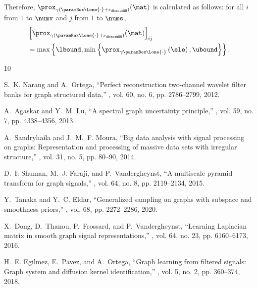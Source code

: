 \documentclass[journal]{IEEEtran}
\begin{document}
Therefore, $\prox_{\gamma(\paramBox \Lone{\cdot} + \iota_{\BoxconNM})} (\mat)$ is calculated as follows: for all $i$ from $1$ to $\numv$ and $j$ from $1$ to $\nums$,
\begin{align}
    &\left[\prox_{\gamma( \paramBox \Lone{\cdot} + \iota_{\BoxconNM})} (\mat)\right]_{ij} \nonumber \\
    &= \max \left\{ \lbound, \min\left\{ \prox_{\gamma \paramBox \Lone{\cdot}}\left(\ele\right), \ubound \right\}\right\}.
\end{align}

\ifCLASSOPTIONcaptionsoff
  \newpage
\fi


\begin{thebibliography}{10}

    S.~K. Narang and A.~Ortega,
    \newblock ``Perfect reconstruction two-channel wavelet filter banks for graph structured data,''
    , vol. 60, no. 6, pp. 2786--2799, 2012.
    
    A.~Agaskar and Y.~M. Lu,
    \newblock ``A spectral graph uncertainty principle,''
    , vol. 59, no. 7, pp. 4338--4356, 2013.
    
    A.~Sandryhaila and J.~M.~F. Moura,
    \newblock ``Big data analysis with signal processing on graphs: Representation and processing of massive data sets with irregular structure,''
    , vol. 31, no. 5, pp. 80--90, 2014.
    
    D.~I. Shuman, M.~J. Faraji, and P.~Vandergheynst,
    \newblock ``A multiscale pyramid transform for graph signals,''
    , vol. 64, no. 8, pp. 2119--2134, 2015.
    
    Y.~Tanaka and Y.~C. Eldar,
    \newblock ``Generalized sampling on graphs with subspace and smoothness priors,''
    , vol. 68, pp. 2272--2286, 2020.
    
    X.~Dong, D.~Thanou, P.~Frossard, and P.~Vandergheynst,
    \newblock ``Learning {L}aplacian matrix in smooth graph signal representations,''
    , vol. 64, no. 23, pp. 6160--6173, 2016.
    
    H.~E. Egilmez, E.~Pavez, and A.~Ortega,
    \newblock ``Graph learning from filtered signals: Graph system and diffusion kernel identification,''
    , vol. 5, no. 2, pp. 360--374, 2018.
    

\end{thebibliography}
\end{document}
